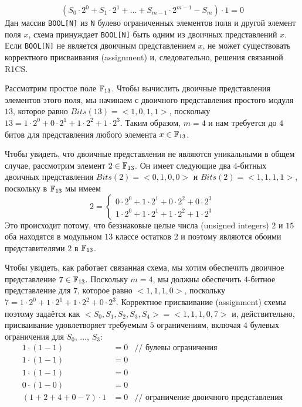 $$
(S_0\cdot 2^0 + S_1\cdot 2^1 + \ldots + S_{m-1}\cdot 2^{m-1} -S_m)\cdot 1 = 0
$$
Дан массив \texttt{BOOL[N]} из \texttt{N} булево ограниченных элементов поля и другой элемент поля $x$, схема принуждает \texttt{BOOL[N]} быть одним из двоичных представлений $x$. Если \texttt{BOOL[N]} не является двоичным представлением $x$, не может существовать корректного присваивания (assignment) и, следовательно, решения связанной R1CS.
\begin{example} Рассмотрим простое поле $\mathbb{F}_{13}$. Чтобы вычислить двоичные представления элементов этого поля, мы начинаем с двоичного представления простого модуля $13$, которое равно $Bits(13) = <1,0,1,1>$, поскольку $13= 1\cdot 2^0 + 0\cdot 2^1 + 1\cdot 2^2 + 1\cdot 2^3$. Таким образом, $m=4$ и нам требуется до $4$ битов для представления любого элемента $x\in\mathbb{F}_{13}$.

Чтобы увидеть, что двоичные представления не являются уникальными в общем случае, рассмотрим элемент $2\in \mathbb{F}_{13}$. Он имеет следующие два $4$-битных двоичных представления $Bits(2)=<0,1,0,0>$ и $Bits(2)=<1,1,1,1>$, поскольку в $\mathbb{F}_{13}$ мы имеем
$$
2 = \begin{cases}
0\cdot 2^0 + 1\cdot 2^1 + 0\cdot 2^2 + 0\cdot 2^3\\
1\cdot 2^0 + 1\cdot 2^1 + 1\cdot 2^2 + 1\cdot 2^3
\end{cases}
$$
Это происходит потому, что беззнаковые целые числа (unsigned integers) $2$ и $15$ оба находятся в модульном $13$ классе остатков $2$ и поэтому являются обоими представителями $2$ в $\mathbb{F}_{13}$.

Чтобы увидеть, как работает связанная схема, мы хотим обеспечить двоичное представление $7\in \mathbb{F}_{13}$. Поскольку $m=4$, мы должны обеспечить $4$-битное представление для $7$, которое равно $<1,1,1,0>$, поскольку $7= 1\cdot 2^0 + 1\cdot 2^1 + 1\cdot 2^2 + 0\cdot 2^3$. Корректное присваивание (assignment) схемы поэтому задаётся как $<S_0,S_1,S_2,S_3,S_4>=<1,1,1,0,7>$ и, действительно, присваивание удовлетворяет требуемым $5$ ограничениям, включая $4$ булевых ограничения для $S_0$, $\ldots$, $S_3$:
\begin{align*}
1\cdot (1-1) &= 0 & \text{// булевы ограничения}\\
1\cdot (1-1) &= 0 \\
1\cdot (1-1) &= 0 \\
0\cdot (1-0) &= 0  \\
(1 + 2 + 4 + 0 -7)\cdot 1 &= 0  & \text{// ограничение двоичного представления}
\end{align*}
\end{example}
